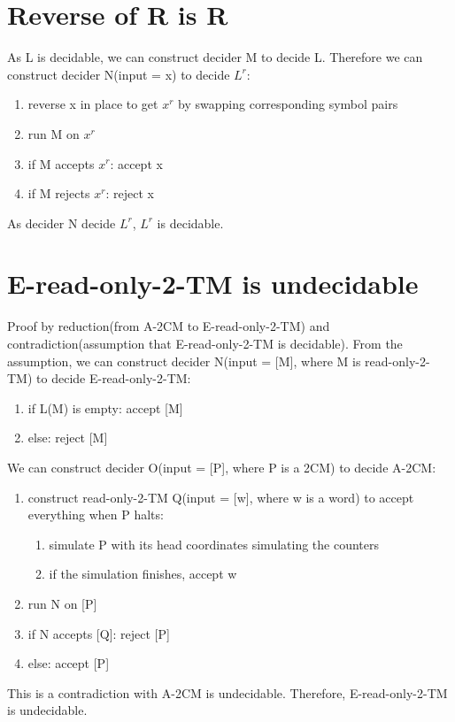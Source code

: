 \documentclass{article}
\begin{document}
\section{Reverse of R is R}
As L is decidable, we can construct decider M to decide L. Therefore we can construct decider N(input = x) to decide $ L^r $:
\begin{enumerate}
	\item reverse x in place to get $ x^r $ by swapping corresponding symbol pairs
	\item run M on $ x^r $
	\item if M accepts $ x^r $: accept x
	\item if M rejects $ x^r $: reject x
\end{enumerate}
As decider N decide $ L^r $, $ L^r $ is decidable.

\section{E-read-only-2-TM is undecidable}
Proof by reduction(from A-2CM to E-read-only-2-TM) and contradiction(assumption that E-read-only-2-TM is decidable). From the assumption, we can construct decider N(input = [M], where M is read-only-2-TM) to decide E-read-only-2-TM:
\begin{enumerate}
	\item if L(M) is empty: accept [M]
	\item else: reject [M]
\end{enumerate}
We can construct decider O(input = [P], where P is a 2CM) to decide A-2CM:
\begin{enumerate}
	\item construct read-only-2-TM Q(input = [w], where w is a word) to accept 
	everything when P halts:
	\begin{enumerate}
		\item simulate P with its head coordinates simulating the counters
		\item if the simulation finishes, accept w
	\end{enumerate}
	\item run N on [P]
	\item if N accepts [Q]: reject [P]
	\item else: accept [P]
\end{enumerate}
This is a contradiction with A-2CM is undecidable. Therefore, E-read-only-2-TM is undecidable.
\end{document}
